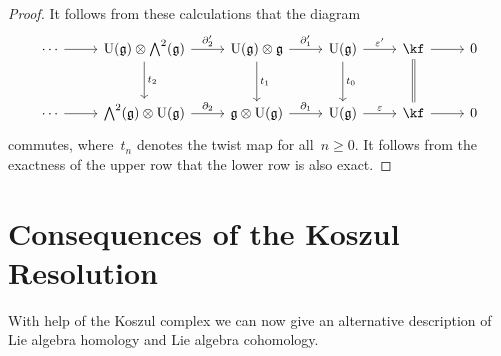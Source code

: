 \begin{proof}
  It follows from these calculations that the diagram
  \[
    \begin{tikzcd}[row sep = large]
      \dotsb
      \arrow{r}
      &
      \Univ(\glie) \otimes \Exterior^2(\glie)
      \arrow{r}[above]{\del'_2}
      \arrow{d}[right]{t_2}
      &
      \Univ(\glie) \otimes \glie
      \arrow{r}[above]{\del'_1}
      \arrow{d}[right]{t_1}
      &
      \Univ(\glie)
      \arrow{r}[above]{\varepsilon'}
      \arrow{d}[right]{t_0}
      &
      \kf
      \arrow{r}
      \arrow[equal]{d}
      &
      0
      \\
      \dotsb
      \arrow{r}
      &
      \Exterior^2(\glie) \otimes \Univ(\glie)
      \arrow{r}[above]{\del_2}
      &
      \glie \otimes \Univ(\glie)
      \arrow{r}[above]{\del_1}
      &
      \Univ(\glie)
      \arrow{r}[above]{\varepsilon}
      &
      \kf
      \arrow{r}
      &
      0
    \end{tikzcd}
  \]
  commutes, where~$t_n$ denotes the twist map for all~$n \geq 0$.
  It follows from the exactness of the upper row that the lower row is also exact.
\end{proof}




\section{Consequences of the Koszul Resolution}

\begin{fluff}
  With help of the Koszul complex we can now give an alternative description of Lie algebra homology and Lie algebra cohomology.
\end{fluff}


